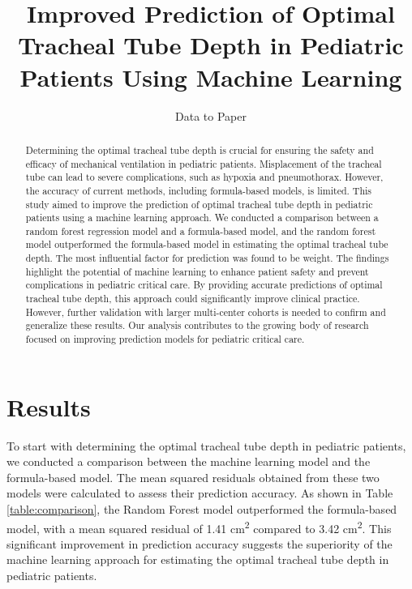 \documentclass[11pt]{article}
\title{Improved Prediction of Optimal Tracheal Tube Depth in Pediatric Patients Using Machine Learning}
\author{Data to Paper}
\begin{document}
\maketitle
\begin{abstract}
Determining the optimal tracheal tube depth is crucial for ensuring the safety and efficacy of mechanical ventilation in pediatric patients. Misplacement of the tracheal tube can lead to severe complications, such as hypoxia and pneumothorax. However, the accuracy of current methods, including formula-based models, is limited. This study aimed to improve the prediction of optimal tracheal tube depth in pediatric patients using a machine learning approach. We conducted a comparison between a random forest regression model and a formula-based model, and the random forest model outperformed the formula-based model in estimating the optimal tracheal tube depth. The most influential factor for prediction was found to be weight. The findings highlight the potential of machine learning to enhance patient safety and prevent complications in pediatric critical care. By providing accurate predictions of optimal tracheal tube depth, this approach could significantly improve clinical practice. However, further validation with larger multi-center cohorts is needed to confirm and generalize these results. Our analysis contributes to the growing body of research focused on improving prediction models for pediatric critical care. 
\end{abstract}
\section*{Results}
To start with determining the optimal tracheal tube depth in pediatric patients, we conducted a comparison between the machine learning model and the formula-based model. The mean squared residuals obtained from these two models were calculated to assess their prediction accuracy. As shown in Table \ref{table:comparison}, the Random Forest model outperformed the formula-based model, with a mean squared residual of 1.41 cm\textsuperscript{2} compared to 3.42 cm\textsuperscript{2}. This significant improvement in prediction accuracy suggests the superiority of the machine learning approach for estimating the optimal tracheal tube depth in pediatric patients.
\end{document}
